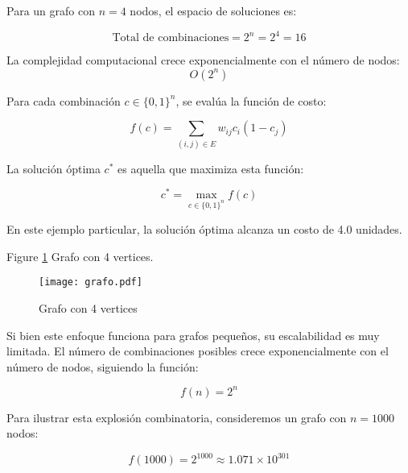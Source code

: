 \documentclass[9pt,a4paper,twoside]{rho-class/rho}
\begin{document}
            Para un grafo con $n=4$ nodos, el espacio de soluciones es:

            \begin{equation}
                \text{Total de combinaciones} = 2^n = 2^4 = 16
            \end{equation}

            La complejidad computacional crece exponencialmente con el número de nodos: \begin{equation}O(2^n)\end{equation}

            Para cada combinación $c \in \{0,1\}^n$, se evalúa la función de costo:

            \begin{equation}
                f(c) = \sum_{(i,j) \in E} w_{ij}c_i(1-c_j)
            \end{equation}

            La solución óptima $c^*$ es aquella que maximiza esta función:

            \begin{equation}
                c^* = \max_{c \in \{0,1\}^n} f(c)
            \end{equation}

            En este ejemplo particular, la solución óptima alcanza un costo de 4.0 unidades.

            Figure \ref{fig:figure} Grafo con 4 vertices.
                
            \begin{figure}[H]
                \centering
                \texttt{[image: grafo.pdf]}
                \caption{Grafo con 4 vertices}
                \label{fig:figure}
            \end{figure}

            Si bien este enfoque funciona para grafos pequeños, su escalabilidad es muy limitada. El número de combinaciones posibles crece exponencialmente con el número de nodos, siguiendo la función:

            \begin{equation}
                f(n) = 2^n
            \end{equation}

            Para ilustrar esta explosión combinatoria, consideremos un grafo con $n = 1000$ nodos:

            \begin{equation}
                f(1000) = 2^{1000} \approx 1.071 \times 10^{301}
            \end{equation}
\end{document}
